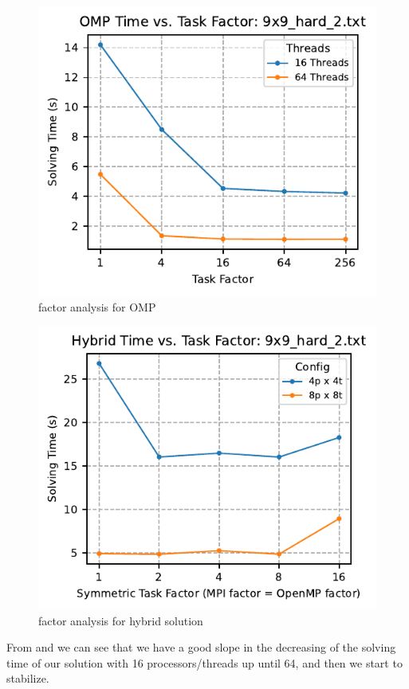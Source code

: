 \begin{figure}[htbp]
\centering
\includegraphics[width=0.9\linewidth]{imgs/factor_omp_9x9_hard_2.pdf}
\caption{factor analysis for OMP}
\label{fig:factor_analysis_omp}
\end{figure}

\begin{figure}[htbp]
\centering
\includegraphics[width=0.9\linewidth]{imgs/factor_hybrid_9x9_hard_2.pdf}
\caption{factor analysis for hybrid solution}
\label{fig:factor_analysis_hybrid}
\end{figure}

From  and  we can see that we have a good slope in the decreasing of the solving time of our solution with 16 processors/threads up until 64, and then we start to stabilize. 


